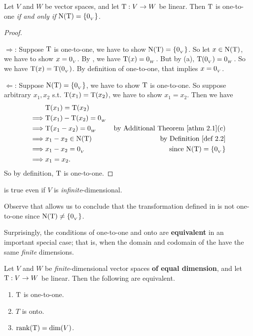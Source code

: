 \begin{theorem} \label{thm 2.4}
Let \(V\) and \(W\) be vector spaces, and let \(\mathrm{T} : V \to W\) be linear.
Then \(\mathrm{T}\) is one-to-one \emph{if and only if} \(\mathrm{N(T)} = \{ 0_{_V} \}\).
\end{theorem}

\begin{proof} \ 

\(\Longrightarrow\): Suppose \(\mathrm{T}\) is one-to-one, we have to show \(\mathrm{N(T)} = \{ 0_{_V} \}\).
So let \(x \in \mathrm{N(T)}\), we have to show \(x = 0_{_V}\).
By , we have \(\mathrm{T}(x) = 0_{_W}\).
But by (a), \(\mathrm{T}(0_{_V}) = 0_{_W}\).
So we have \(\mathrm{T}(x) = \mathrm{T}(0_{_V})\).
By definition of one-to-one, that implies \(x = 0_{_V}\).

\(\Longleftarrow\):
Suppose \(\mathrm{N(T)} = \{ 0_{_V} \}\), we have to show \(\mathrm{T}\) is one-to-one.
So suppose arbitrary \(x_1, x_2\) s.t. \(\mathrm{T}(x_1) = \mathrm{T}(x_2)\), we have to show \(x_1 = x_2\).
Then we have
\begin{align*}
             & \T(x_1) = \T(x_2) \\
    \implies & \T(x_1) - \T(x_2) = \OW \\
    \implies & \T(x_1 - x_2) = \OW & \text{by \ATHM{2.1}(c)} \\
    \implies & x_1 - x_2 \in \NULLT & \text{by \DEF{2.2}} \\
    \implies & x_1 - x_2 = \OV & \text{since \(\NULLT = \{ \OV \}\)} \\
    \implies & x_1 = x_2.
\end{align*}
So by definition, \(\mathrm{T}\) is one-to-one.
\end{proof}

\begin{remark} \label{remark 2.1.9}
 is true even if \(V\) is \emph{infinite}-dimensional.
\end{remark}

\begin{note}
Observe that  allows us to conclude that the transformation defined in  is not one-to-one since \(\mathrm{N(T)} \ne \{ 0_{_V} \}\).
\end{note}

Surprisingly, the conditions of one-to-one and onto are \textbf{equivalent} in an important special case; that is, when the domain and codomain of the \LTRAN{} have the same \emph{finite} dimensions.

\begin{theorem} \label{thm 2.5}
Let \(V\) and \(W\) be \emph{finite}-dimensional vector spaces \textbf{of equal dimension}, and let \(\mathrm{T} : V \to W\) be linear.
Then the following are equivalent.
\begin{enumerate}
\item \(\mathrm{T}\) is one-to-one.
\item \(T\) is onto.
\item \(\mathrm{rank}(\mathrm{T}) = \dim(V)\).
\end{enumerate}
\end{theorem}

